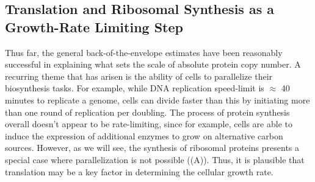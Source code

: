 
\subsection{Translation and Ribosomal Synthesis as a Growth-Rate Limiting Step}
Thus far, the general back-of-the-envelope estimates have been reasonably
successful in explaining what sets the scale of absolute protein copy number. A
recurring theme that has arisen is the ability of cells to parallelize their
biosynthesis tasks. For example, while DNA replication speed-limit is $\approx$
40 minutes to replicate a genome, cells can divide faster than this by
initiating more than one round of replication per doubling. The process of
protein synthesis overall  doesn't appear to be rate-limiting, since for
example, cells are able to induce the  expression of additional enzymes to grow
on alternative carbon sources.  However, as we will see, the synthesis of ribosomal
proteins presents a special case where parallelization is not possible
((A)). Thus, it is plausible that translation may be a key
factor in determining the cellular growth rate.


%

